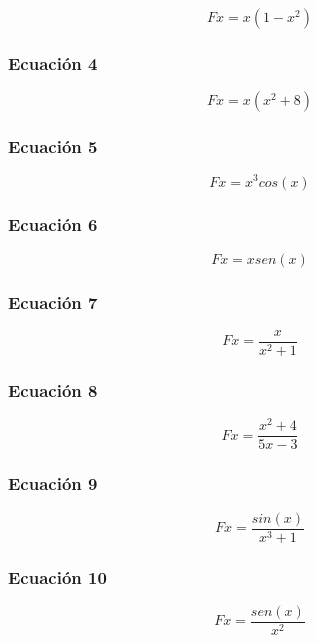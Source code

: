 \documentclass[11pt,]{article}
\begin{document}
\[Fx= x(1 - x^2) \]

\hypertarget{ecuaciuxf3n-4}{%
\subsubsection{Ecuación 4}\label{ecuaciuxf3n-4}}

\[Fx= x(x^2 + 8)\]

\hypertarget{ecuaciuxf3n-5}{%
\subsubsection{Ecuación 5}\label{ecuaciuxf3n-5}}

\[Fx= x^3 cos(x) \]

\hypertarget{ecuaciuxf3n-6}{%
\subsubsection{Ecuación 6}\label{ecuaciuxf3n-6}}

\[Fx= x sen(x) \]

\hypertarget{ecuaciuxf3n-7}{%
\subsubsection{Ecuación 7}\label{ecuaciuxf3n-7}}

\[Fx= \frac{x}{x^2+1} \]

\hypertarget{ecuaciuxf3n-8}{%
\subsubsection{Ecuación 8}\label{ecuaciuxf3n-8}}

\[Fx= \frac{x^2 + 4}{5x - 3} \]

\hypertarget{ecuaciuxf3n-9}{%
\subsubsection{Ecuación 9}\label{ecuaciuxf3n-9}}

\[Fx= \frac{sin(x)}{x^3 + 1} \]

\hypertarget{ecuaciuxf3n-10}{%
\subsubsection{Ecuación 10}\label{ecuaciuxf3n-10}}

\[Fx= \frac{sen(x)}{x^2} \]

\newpage
\singlespacing 
\end{document}
